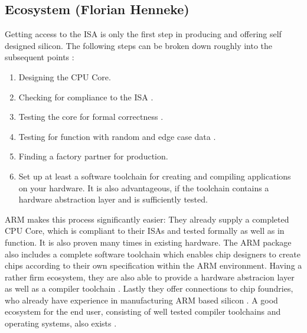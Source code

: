 \documentclass[conference]{IEEEtran}
\begin{document}
	\subsection{Ecosystem (Florian Henneke)}
	\label{ecosystem}
	Getting access to the ISA is only the first step in producing and offering self designed silicon.
	The following steps can be broken down roughly into the subsequent points \cite{ARM2019}:
	\begin{enumerate}
		\item Designing the CPU Core.
		\item Checking for compliance to the ISA \cite{Bartley2020}.
		\item Testing the core for formal correctness \cite{Bartley2020}.
		\item Testing for function with random and edge case data \cite{Bartley2020}.
		\item Finding a factory partner for production.
		\item Set up at least a software toolchain for creating and compiling applications on your hardware. It is also advantageous, if the toolchain contains a hardware abstraction layer and is sufficiently tested.
	\end{enumerate}
	ARM makes this process significantly easier: They already supply a completed CPU Core, which is compliant to their \glspl{ISA} and tested formally as well as in function. It is also proven many times in existing hardware. The ARM package also includes a complete software toolchain which enables chip designers to create chips according to their own specification within the ARM environment. Having a rather firm ecosystem, they are also able to provide a hardware abstracion layer as well as a compiler toolchain \cite{CMSIS}. Lastly they offer connections to chip foundries, who already have experience in manufacturing ARM based silicon \cite{ARM2019}.
	A good ecosystem for the end user, consisting of well tested compiler toolchains \cite{ARMGNU} and operating systems, also exists \cite{Microsoft2020}\cite{RedHat}.
\end{document}
